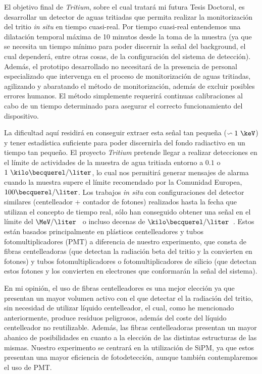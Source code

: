 El objetivo final de \textit{Tritium}, sobre el cual tratará mi futura Tesis Doctoral, es desarrollar un detector de aguas tritiadas que permita realizar la monitorización del tritio \textit{in situ} en tiempo cuasi-real. Por tiempo cuasi-real entendemos una dilatación temporal máxima de 10 minutos desde la toma de la muestra (ya que se necesita un tiempo mínimo para poder discernir la señal del background, el cual dependerá, entre otras cosas, de la configuración del sistema de detección). Además, el prototipo desarrollado no necesitará de la presencia de personal especializado que intervenga en el proceso de monitorización de aguas tritiadas, agilizando y abaratando el método de monitorización, además de excluir posibles errores humanos. El método simplemente requerirá continuas calibraciones al cabo de un tiempo determinado para asegurar el correcto funcionamiento del dispositivo. 

La dificultad aquí residirá en conseguir extraer esta señal tan pequeña ($\backsim 1~\keV$) y tener estadística suficiente para poder discernirla del fondo radiactivo en un tiempo tan pequeño. El proyecto \textit{Tritium} pretende llegar a realizar detecciones en el límite de actividades de la muestra de agua tritiada entorno a $0.1$ o $1~\kilo\becquerel/\liter$, lo cual nos permitirá generar mensajes de alarma cuando la muestra supere el límite recomendado por la Comunidad Europea, $100\becquerel/\liter$. Los trabajos \textit{in situ} con configuraciones del detector similares (centelleador + contador de fotones) realizados hasta la fecha que utilizan el concepto de tiempo real, sólo han conseguido obtener una señal en el límite del $\MeV/\liter$~\cite{TesisTritio} o incluso decenas de $\kilo\becquerel/\liter$~\cite{Rat}. Estos están basados principalmente en plásticos centelleadores y tubos fotomultiplicadores (PMT) a diferencia de nuestro experimento, que consta de fibras centelleadoras (que detectan la radiación beta del tritio y la convierten en fotones) y tubos fotomultiplicadores o fotomultiplicadores de silicio (que detectan estos fotones y los convierten en electrones que conformarán la señal del sistema). 

En mi opinión, el uso de fibras centelleadores es una mejor elección ya que presentan un mayor volumen activo con el que detectar el la radiación del tritio,  sin necesidad de utilizar líquido centelleador, el cual, como he mencionado anteriormente, produce residuos peligrosos, además del coste del líquido centelleador no reutilizable. Además, las fibras centelleadoras presentan un mayor abanico de posibilidades en cuanto a la elección de las distintas estructuras de las mismas. Nuestro experimento se centrará en la utilización de SiPM, ya que estos presentan una mayor eficiencia de fotodetección, aunque también contemplaremos el uso de PMT. 


